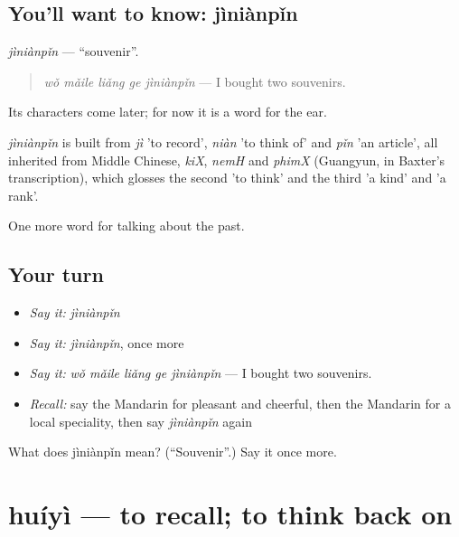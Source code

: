 \subsection*{You'll want to know: jìniànpǐn}
\emph{jìniànpǐn} — \textquotedblleft{}souvenir\textquotedblright{}.

\begin{quote}
\emph{wǒ mǎile liǎng ge jìniànpǐn} — I bought two souvenirs.
\end{quote}

Its characters come later; for now it is a word for the ear.

\begin{cousinweb}
\emph{jìniànpǐn} is built from \emph{jì} 'to record', \emph{niàn} 'to think of' and \emph{pǐn} 'an article', all inherited from Middle Chinese, \emph{kiX}, \emph{nemH} and \emph{phimX} (Guangyun, in Baxter's transcription), which glosses the second 'to think' and the third 'a kind' and 'a rank'.
\end{cousinweb}

\begin{grammarlens}[title={What you've built}]
One more word for talking about the past.
\end{grammarlens}

\subsection*{Your turn}
\begin{itemize}
\raggedright
  \item \emph{Say it:} \emph{jìniànpǐn}
  \item \emph{Say it:} \emph{jìniànpǐn}, once more
  \item \emph{Say it:} \emph{wǒ mǎile liǎng ge jìniànpǐn} — I bought two souvenirs.
  \item \emph{Recall:} say the Mandarin for pleasant and cheerful, then the Mandarin for a local speciality, then say \emph{jìniànpǐn} again
\end{itemize}

\begin{tcolorbox}[breakable,colback=teal!4,colframe=teal!35!black,title={Before you move on}]
What does jìniànpǐn mean? (\textquotedblleft{}Souvenir\textquotedblright{}.) Say it once more.
\end{tcolorbox}
\section[huíyì]{huíyì — to recall; to think back on}

